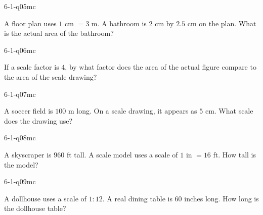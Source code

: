 \begin{practiceQuestion}{6-1-q05}{mc}
\begin{questionText}
A floor plan uses $1$ cm $= 3$ m. A bathroom is $2$ cm by $2.5$ cm on the plan. What is the actual area of the bathroom?
\end{questionText}
\end{practiceQuestion}

\begin{practiceQuestion}{6-1-q06}{mc}
\begin{questionText}
If a scale factor is $4$, by what factor does the area of the actual figure compare to the area of the scale drawing?
\end{questionText}
\end{practiceQuestion}

\begin{practiceQuestion}{6-1-q07}{mc}
\begin{questionText}
A soccer field is $100$ m long. On a scale drawing, it appears as $5$ cm. What scale does the drawing use?
\end{questionText}
\end{practiceQuestion}

\begin{practiceQuestion}{6-1-q08}{mc}
\begin{questionText}
A skyscraper is $960$ ft tall. A scale model uses a scale of $1$ in $= 16$ ft. How tall is the model?
\end{questionText}
\end{practiceQuestion}

\begin{practiceQuestion}{6-1-q09}{mc}
\begin{questionText}
A dollhouse uses a scale of $1:12$. A real dining table is $60$ inches long. How long is the dollhouse table?
\end{questionText}
\end{practiceQuestion}

